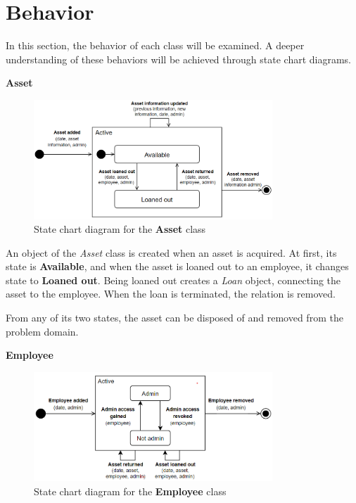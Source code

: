 \section{Behavior} \label{sc:behavoir}
In this section, the behavior of each class will be examined. A deeper understanding of these behaviors will be achieved through state chart diagrams.

\large{\textbf{Asset}}
\begin{figure}[H]
    \centering
    \includegraphics[width=0.8\textwidth]{figures/StateCharts/Asset_state_chart.png}
    \caption{State chart diagram for the \textbf{Asset} class}
    \label{fig:asset_statechart}
\end{figure}

An object of the \textit{Asset} class is created when an asset is acquired. At first, its state is \textbf{Available}, and when the asset is loaned out to an employee, it changes state to \textbf{Loaned out}. Being loaned out creates a \textit{Loan} object, connecting the asset to the employee. When the loan is terminated, the relation is removed.
\par
From any of its two states, the asset can be disposed of and removed from the problem domain. 

\large{\textbf{Employee}}
\begin{figure}[H]
    \centering
    \includegraphics[width=0.8\textwidth]{figures/StateCharts/Employee_state_chart.png}
    \caption{State chart diagram for the \textbf{Employee} class}
    \label{fig:employee_statechart}
\end{figure}

